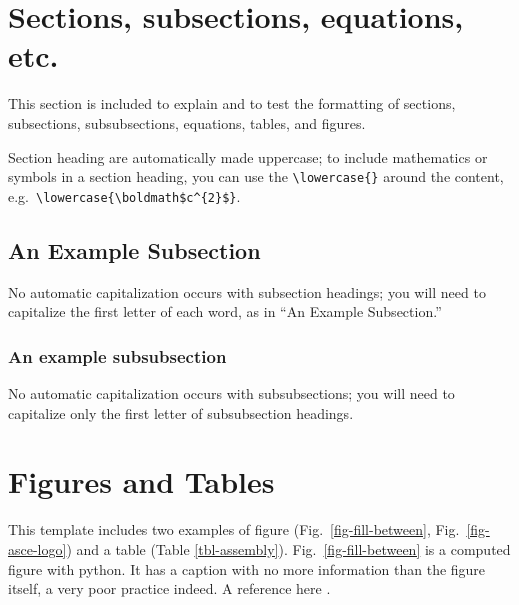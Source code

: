 \documentclass[Journal,LineNumbers]{ascelike-new}
\begin{document}
\section{Sections, subsections, equations,
etc.}\label{sections-subsections-equations-etc.}

This section is included to explain and to test the formatting of
sections, subsections, subsubsections, equations, tables, and figures.

Section heading are automatically made uppercase; to include mathematics
or symbols in a section heading, you can use the
\texttt{\textbackslash{}lowercase\{\}} around the content,
e.g.~\texttt{\textbackslash{}lowercase\{\textbackslash{}boldmath\$c\^{}\{2\}\$\}}.

\subsection{An Example Subsection}\label{an-example-subsection}

No automatic capitalization occurs with subsection headings; you will
need to capitalize the first letter of each word, as in ``An Example
Subsection.''

\subsubsection{An example subsubsection}\label{an-example-subsubsection}

No automatic capitalization occurs with subsubsections; you will need to
capitalize only the first letter of subsubsection headings.

\section{Figures and Tables}\label{figures-and-tables}

This template includes two examples of figure
(Fig.~\ref{fig-fill-between}, Fig.~\ref{fig-asce-logo}) and a table
(Table \ref{tbl-assembly}). Fig.~\ref{fig-fill-between} is a computed
figure with python. It has a caption with no more information than the
figure itself, a very poor practice indeed. A reference here
\citep{Stahl:2004a}.
\end{document}
